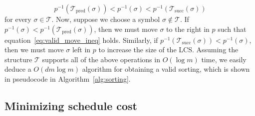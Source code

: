 \documentclass{siamart190516}
\begin{document}
 \begin{equation}\label{eq:valid_move_ineq}
 	p^{-1}(\mathcal{T}_{\mathrm{pred}}(\sigma)) < p^{-1}(\sigma) < p^{-1}(\mathcal{T}_{\mathrm{succ}}(\sigma))
 \end{equation}
  for every $\sigma \in \mathcal{T}$. Now, suppose we choose a symbol $\sigma \notin \mathcal{T}$. If $p^{-1}(\sigma) < p^{-1}(\mathcal{T}_{\mathrm{pred}}(\sigma))$, then we must move $\sigma$ to the right in $p$ such that equation~\ref{eq:valid_move_ineq} holds. Similarly, if  $p^{-1}(\mathcal{T}_{\mathrm{succ}}(\sigma)) < p^{-1}(\sigma)$, then we must move $\sigma$ left in $p$ to increase the size of the LCS. Assuming the structure $\mathcal{T}$ supports all of the above operations in $O(\log m)$ time, we easily deduce a $O(d m\log m)$ algorithm for obtaining a valid sorting, which is shown in pseudocode in Algorithm~\ref{alg:sorting}.   
 
 
 
\subsection{Minimizing schedule cost}\label{sec:schedule_cost}
\end{document}
